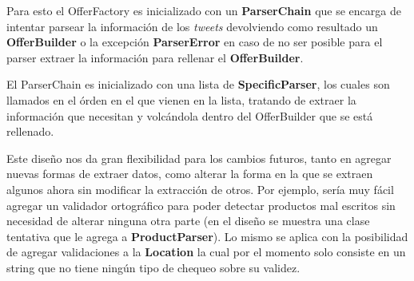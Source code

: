 \documentclass[10pt, a4paper]{article}
\begin{document}
Para esto el OfferFactory es inicializado con un \textbf{ParserChain} que se encarga de intentar parsear la información de los \emph{tweets} devolviendo como resultado un \textbf{OfferBuilder} o la excepción  \textbf{ParserError} en caso de no ser posible para el parser extraer la información para rellenar el \textbf{OfferBuilder}.

El ParserChain es inicializado con una lista de \textbf{SpecificParser}, los cuales son llamados en el órden en el que vienen en la lista, tratando de extraer la información que necesitan y volcándola dentro del OfferBuilder que se está rellenado.

Este diseño nos da gran flexibilidad para los cambios futuros, tanto en agregar nuevas formas de extraer datos, como alterar la forma en la que se extraen algunos ahora sin modificar la extracción de otros. Por ejemplo, sería muy fácil agregar un validador ortográfico para poder detectar productos mal escritos sin necesidad de alterar ninguna otra parte (en el diseño se muestra una clase tentativa que le agrega a \textbf{ProductParser}). Lo mismo se aplica con la posibilidad de agregar validaciones a la \textbf{Location} la cual por el momento solo consiste en un string que no tiene ningún tipo de chequeo sobre su validez.
\end{document}
